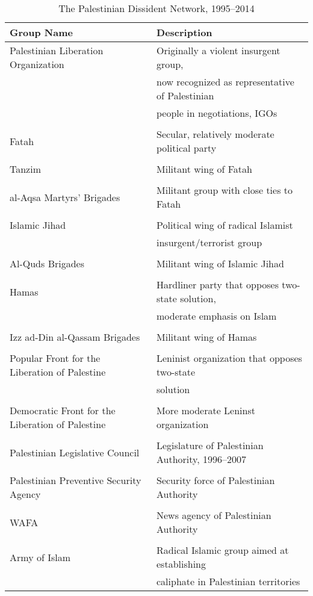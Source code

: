 \begin{table}
\centering
\begin{tabular}{ll}
Group Name & Description\\
\hline
Palestinian Liberation Organization & Originally a violent insurgent group,\\
 & now recognized as representative of Palestinian\\
 & people in negotiations, IGOs\\ 
\skip\\
Fatah & Secular, relatively moderate political party\\
\skip\\
Tanzim & Militant wing of Fatah\\
\skip\\
al-Aqsa Martyrs' Brigades & Militant group with close ties to Fatah\\
\skip\\
Islamic Jihad & Political wing of radical Islamist\\
& insurgent/terrorist group\\
\skip\\
Al-Quds Brigades & Militant wing of Islamic Jihad\\
\skip\\
Hamas & Hardliner party that opposes two-state solution,\\
& moderate emphasis on Islam\\
\skip\\
Izz ad-Din al-Qassam Brigades & Militant wing of Hamas\\
\skip\\
Popular Front for the Liberation of Palestine & Leninist organization that opposes two-state\\
& solution\\
\skip\\
Democratic Front for the Liberation of Palestine & More moderate Leninst organization\\
\skip\\
Palestinian Legislative Council & Legislature of Palestinian Authority, 1996--2007\\
\skip\\
Palestinian Preventive Security Agency & Security force of Palestinian Authority\\
\skip\\
WAFA & News agency of Palestinian Authority\\
\skip\\
Army of Islam & Radical Islamic group aimed at establishing\\
& caliphate in Palestinian territories\\
\hline
\end{tabular}
\caption{The Palestinian Dissident Network, 1995--2014}
\label{paldiss}
\end{table}

